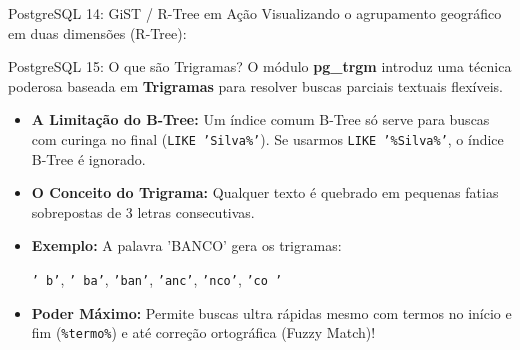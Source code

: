 \documentclass[9pt]{beamer}
\begin{document}
\begin{frame}{PostgreSQL 14: GiST / R-Tree em Ação}
    Visualizando o agrupamento geográfico em duas dimensões (R-Tree):
    
    \vspace{0.3cm}
    \begin{center}
    \end{center}
\end{frame}

\begin{frame}{PostgreSQL 15: O que são Trigramas?}
    O módulo \textbf{pg\_trgm} introduz uma técnica poderosa baseada em \textbf{Trigramas} para resolver buscas parciais textuais flexíveis.
    
    \vspace{0.3cm}
    \begin{itemize}
        \item \textbf{A Limitação do B-Tree:} Um índice comum B-Tree só serve para buscas com curinga no final (\texttt{LIKE 'Silva\%'}). Se usarmos \texttt{LIKE '\%Silva\%'}, o índice B-Tree é ignorado.
        \item \textbf{O Conceito do Trigrama:} Qualquer texto é quebrado em pequenas fatias sobrepostas de 3 letras consecutivas.
        \item \textbf{Exemplo:} A palavra 'BANCO' gera os trigramas:
        \begin{center}
            \texttt{'  b'}, \texttt{' ba'}, \texttt{'ban'}, \texttt{'anc'}, \texttt{'nco'}, \texttt{'co '}
        \end{center}
        \item \textbf{Poder Máximo:} Permite buscas ultra rápidas mesmo com termos no início e fim (\texttt{\%termo\%}) e até correção ortográfica (Fuzzy Match)!
    \end{itemize}
\end{frame}
\end{document}
